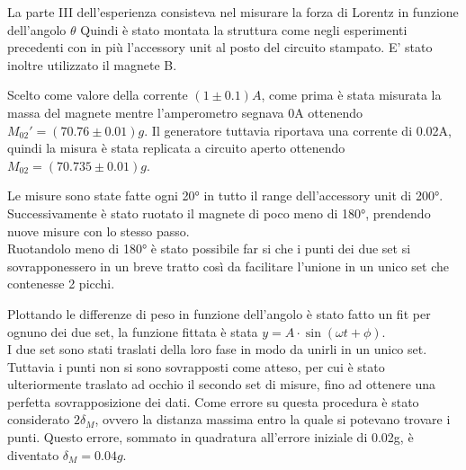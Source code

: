 {\fontsize{12}{14}\selectfont 

La parte III dell'esperienza consisteva nel misurare la forza di Lorentz in funzione dell'angolo $\theta$ Quindi è stato montata la struttura come negli esperimenti precedenti con in più l'accessory unit al posto del circuito stampato. E' stato inoltre utilizzato il magnete B.
\par
Scelto come valore della corrente $(1 \pm 0.1) A$, come prima è stata misurata la massa del magnete mentre l'amperometro segnava 0A ottenendo $M_{02}' = (70.76 \pm 0.01) g$. Il generatore tuttavia riportava una corrente di 0.02A, quindi la misura è stata replicata a circuito aperto ottenendo $M_{02} = (70.735 \pm 0.01) g$.
\par
Le misure sono state fatte ogni 20° in tutto il range dell'accessory unit di 200°. Successivamente è stato ruotato il magnete di poco meno di 180°, prendendo nuove misure con lo stesso passo.
\\
Ruotandolo meno di 180° è stato possibile far si che i punti dei due set si sovrapponessero in un breve tratto così da facilitare l'unione in un unico set che contenesse 2 picchi.
\par
Plottando le differenze di peso in funzione dell'angolo è stato fatto un fit per ognuno dei due set, la funzione fittata è stata $y = A\cdot \sin(\omega t + \phi)$.
\\
I due set sono stati traslati della loro fase in modo da unirli in un unico set. Tuttavia i punti non si sono sovrapposti come atteso, per cui è stato ulteriormente traslato ad occhio il secondo set di misure, fino ad ottenere una perfetta sovrapposizione dei dati. Come errore su questa procedura è stato considerato $2\delta_{M}$, ovvero la distanza massima entro la quale si potevano trovare i punti. Questo errore, sommato in quadratura all'errore iniziale di 0.02g, è diventato $\delta_M = 0.04g$.

\par}